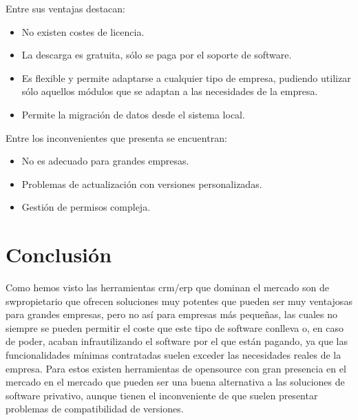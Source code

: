 Entre sus ventajas destacan:
\begin{itemize}
\item No existen costes de licencia.
\item La descarga es gratuita, sólo se paga por el soporte de software.
\item Es flexible y permite adaptarse a cualquier tipo de empresa, pudiendo utilizar sólo aquellos módulos que se adaptan a las necesidades de la empresa.
\item Permite la migración de datos desde el sistema local.
\end{itemize}

Entre los inconvenientes que presenta se encuentran:
\begin{itemize}
\item No es adecuado para grandes empresas.
\item Problemas de actualización con versiones personalizadas.
\item Gestión de permisos compleja.
\end{itemize}


\section{Conclusión}
\label{sec:estado-arte-conclusion}
Como hemos visto las herramientas \acrshort{crm}/\acrshort{erp} que dominan el mercado son de \gls{swpropietario} que ofrecen soluciones muy potentes que pueden ser muy ventajosas para grandes empresas, pero no así para empresas más pequeñas, las cuales no siempre se pueden permitir el coste que este tipo de software conlleva o, en caso de poder, acaban infrautilizando el software por el que están pagando, ya que las funcionalidades mínimas contratadas suelen exceder las necesidades reales de la empresa. Para estos existen herramientas de \gls{opensource} con gran presencia en el mercado en el mercado que pueden ser una buena alternativa a las soluciones de software privativo, aunque tienen el inconveniente de que suelen presentar problemas de compatibilidad de versiones.

